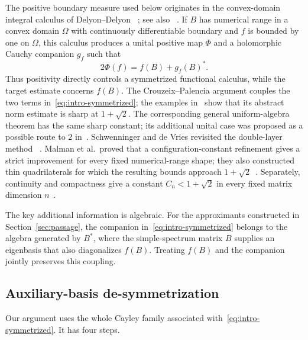 \documentclass[preprints,article,submit,oneauthor]{Definitions/mdpi}
\theoremstyle{mdpi}
\theoremstyle{definition}
\begin{document}
The positive boundary measure used below originates in the
convex-domain integral calculus of Delyon--Delyon~%
\cite{DelyonDelyon1999}; see also~%
\cite{BadeaCrouzeixDelyon2006,CrouzeixPalencia2017}.  If $B$ has
numerical range in a convex domain $\Omega$ with continuously
differentiable boundary and $f$ is bounded by one on $\Omega$, this
calculus produces a unital positive map $\Phi$ and a holomorphic Cauchy
companion $g_f$ such that
\begin{equation}
  2\Phi(f)=f(B)+g_f(B)^*.
  \label{eq:intro-symmetrized}
\end{equation}
Thus positivity directly controls a symmetrized functional calculus,
while the target estimate concerns $f(B)$.  The
Crouzeix--Palencia argument couples the two terms
in~\eqref{eq:intro-symmetrized}; the examples
in~\cite{RansfordSchwenninger2018} show that its abstract norm estimate
is sharp at $1+\sqrt2$.  The corresponding general uniform-algebra
theorem has the same sharp constant; its additional unital case was
proposed as a possible route to $2$
in~\cite{ClouatreOstermannRansford2023}.
Schwenninger and de Vries revisited the double-layer method~%
\cite{SchwenningerDeVries2025}.  Malman et al.\ proved that a
configuration-constant refinement gives a strict improvement for every
fixed numerical-range shape; they also constructed thin quadrilaterals
for which the resulting bounds approach
$1+\sqrt2$~\cite{MalmanEtAl2025}.
Separately,
continuity and compactness give a constant $C_n<1+\sqrt2$ in every
fixed matrix dimension $n$~\cite{MalmanRatio2024}.

The key additional information is algebraic.  For the approximants
constructed in Section~\ref{sec:passage}, the companion
in~\eqref{eq:intro-symmetrized} belongs to the algebra generated by
$B^*$, where the simple-spectrum matrix $B$ supplies an eigenbasis that
also diagonalizes $f(B)$.  Treating $f(B)$ and the companion jointly
preserves this coupling.

\subsection{Auxiliary-basis de-symmetrization}

Our argument uses the whole Cayley family associated
with~\eqref{eq:intro-symmetrized}.  It has four steps.
\end{document}
